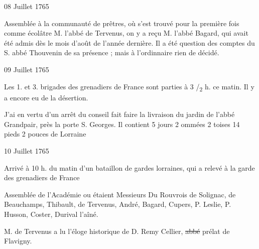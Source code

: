                      \begin{diary}{08 Juillet 1765}{}

                         Assemblée à la communauté de prêtres,
                           où
                           s'est trouvé pour la première fois comme
                           écolâtre M. l'abbé de Tervenus,
                           on y a reçu
                           M. l'abbé Bagard, qui avait
                           été admis dès
                           le mois d'août de l'année dernière.
                           Il a été
                           question des comptes du S. abbé
                              Thouvenin
                           de sa présence ; mais à l'ordinnaire rien de décidé. \bigskip


                     \end{diary}

                     \begin{diary}{09 Juillet 1765}{}

                         Les 1. et
                              3. brigades des grenadiers
                           de France sont parties à 3 /\textsubscript{2} h. ce matin.
                           Il y a encore eu de la désertion. \bigskip


                         J'ai en vertu d'un arrêt du conseil
                           fait faire la livraison du jardin de
                           l'abbé Grandpair, près
                              la porte S.
                              Georges.
                           Il contient 5 jours 2 ommées 2 toises 14 pieds 2 pouces de Lorraine
                        \bigskip


                     \end{diary}

                     \begin{diary}{10 Juillet 1765}{}

                         Arrivé à 10 h. du matin d'un bataillon
                           de gardes lorraines, qui a relevé à la garde
                           des grenadiers de France
                        \bigskip


                         Assemblée de l'Académie ou étaient Messieurs
                           Du Rouvrois
                           de Solignac, de Beauchamps, Thibault, de
                           Tervenus,
                           André, Bagard, Cupers,
                              P. Leslie, P. Husson, Coster,
                           Durival l'aîné. \bigskip



                           M. de Tervenus a lu l'éloge historique de
                              D. Remy
                                 Cellier, \sout{abbé} prélat de Flavigny. \bigskip


                     \end{diary}


